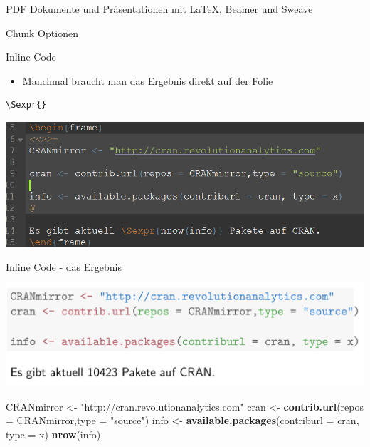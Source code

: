 \documentclass[ignorenonframetext,]{beamer}
\newenvironment{Shaded}{}{}
\newcommand{\KeywordTok}[1]{\textcolor[rgb]{0.00,0.44,0.13}{\textbf{{#1}}}}
\newcommand{\DataTypeTok}[1]{\textcolor[rgb]{0.56,0.13,0.00}{{#1}}}
\newcommand{\StringTok}[1]{\textcolor[rgb]{0.25,0.44,0.63}{{#1}}}
\newcommand{\NormalTok}[1]{{#1}}
\providecommand{\tightlist}{%
\setlength{\itemsep}{0pt}\setlength{\parskip}{0pt}}
\begin{document}
\begin{frame}[fragile]{PDF Dokumente und Präsentationen mit LaTeX,
Beamer und Sweave}
\begin{block}{\href{http://k-baeumchen.fuhlbrueck.net/R-und-LaTeX.html}{Chunk
Optionen}}
\end{block}

\begin{block}{Inline Code}

\begin{itemize}
\tightlist
\item
  Manchmal braucht man das Ergebnis direkt auf der Folie
\end{itemize}

\begin{verbatim}
\Sexpr{}
\end{verbatim}

\includegraphics{./tex2pdf.9796/ed18be517977d19723c5b6fd48c9cac20ae9d298.png}

\end{block}

\begin{block}{Inline Code - das Ergebnis}

\includegraphics{./tex2pdf.9796/f60740548ad42db8063f482d3e0d7bcc1a5c3422.png}

\begin{Shaded}
\begin{Highlighting}[]
\NormalTok{CRANmirror <-}\StringTok{ "http://cran.revolutionanalytics.com"}
\NormalTok{cran <-}\StringTok{ }\KeywordTok{contrib.url}\NormalTok{(}\DataTypeTok{repos =} \NormalTok{CRANmirror,}\DataTypeTok{type =} \StringTok{"source"}\NormalTok{)}
\NormalTok{info <-}\StringTok{ }\KeywordTok{available.packages}\NormalTok{(}\DataTypeTok{contriburl =} \NormalTok{cran, }\DataTypeTok{type =} \NormalTok{x)}
\KeywordTok{nrow}\NormalTok{(info)}
\end{Highlighting}
\end{Shaded}


\end{block}
\end{frame}
\end{document}
